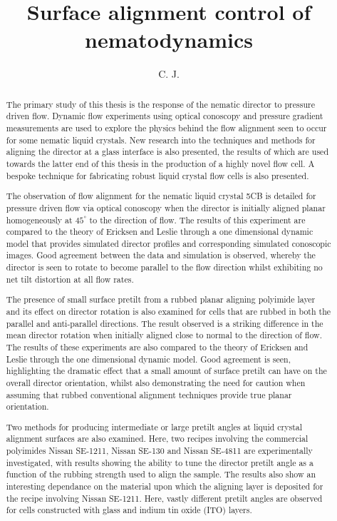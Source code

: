 \documentclass[prb,reprint,superscriptaddress,showpacs]{revtex4-1}
\begin{document}
\title{Surface alignment control of nematodynamics}
\author{C. J. }

\begin{abstract}
The primary study of this thesis is the response of the nematic director to pressure driven flow. Dynamic flow experiments using optical conoscopy and pressure gradient measurements are used to explore the physics behind the flow alignment seen to occur for some nematic liquid crystals. New research into the techniques and methods for aligning the director at a glass interface is also presented, the results of which are used towards the latter end of this thesis in the production of a highly novel flow cell. A bespoke technique for fabricating robust liquid crystal flow cells is also presented.

The observation of flow alignment for the nematic liquid crystal 5CB is detailed for pressure driven flow via optical conoscopy when the director is initially aligned planar homogeneously at $45^{\circ}$ to the direction of flow. The results of this experiment are compared to the theory of Ericksen and Leslie through a one dimensional dynamic model that provides simulated director profiles and corresponding simulated conoscopic images. Good agreement between the data and simulation is observed, whereby the director is seen to rotate to become parallel to the flow direction whilst exhibiting no net tilt distortion at all flow rates.

The presence of small surface pretilt from a rubbed planar aligning polyimide layer and its effect on director rotation is also examined for cells that are rubbed in both the parallel and anti-parallel directions. The result observed is a striking difference in the mean director rotation when initially aligned close to normal to the direction of flow. The results of these experiments are also compared to the theory of Ericksen and Leslie through the one dimensional dynamic model. Good agreement is seen, highlighting the dramatic effect that a small amount of surface pretilt can have on the overall director orientation, whilst also demonstrating the need for caution when assuming that rubbed conventional alignment techniques provide true planar orientation.

Two methods for producing intermediate or large pretilt angles at liquid crystal alignment surfaces are also examined. Here, two recipes involving the commercial polyimides Nissan SE-1211, Nissan SE-130 and Nissan SE-4811 are experimentally investigated, with results showing the ability to tune the director pretilt angle as a function of the rubbing strength used to align the sample. The results also show an interesting dependance on the material upon which the aligning layer is deposited for the recipe involving Nissan SE-1211. Here, vastly different pretilt angles are observed for cells constructed with glass and indium tin oxide (ITO) layers.


\end{abstract}
\end{document}
